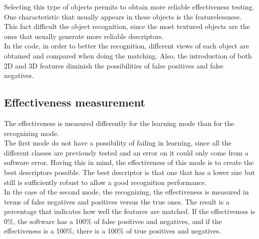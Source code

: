 		Selecting this type of objects permits to obtain more reliable effectiveness testing. One characteristic that usually appears in these objects is the featurelessness. This fact difficult the object recognition, since the most textured objects are the ones that usually generate more reliable descriptors. \\

		In the code, in order to better the recognition, different views of each object are obtained and compared when doing the matching. Also, the introduction of both 2D and 3D features diminish the possibilities of false positives and false negatives. 

	\subsection{Effectiveness measurement}

		The effectiveness is measured differently for the learning mode than for the recognizing mode. 
		\\

		The first mode do not have a possibility of failing in learning, since all the different classes are previously tested and an error on it could only come from a software error. Having this in mind, the effectiveness of this mode is to create the best descriptors possible. 
		The best descriptor is that one that has a lower size but still is sufficiently robust to allow a good recognition performance. 
		\\

		In the case of the second mode, the recognizing, the effectiveness is measured in terms of false negatives and positives versus the true ones. The result is a percentage that indicates how well the features are matched. If the effectiveness is 0\%, the software has a 100\% of false positives and negatives, and if the effectiveness is a 100\%, there is a 100\% of true positives and negatives. \\

		